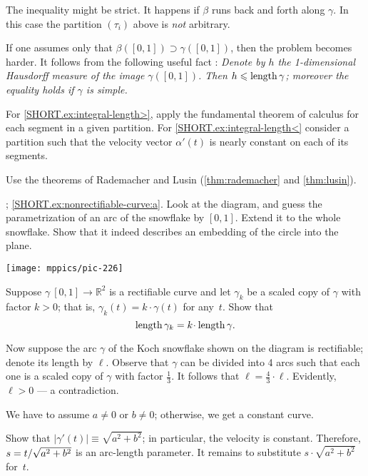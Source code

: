\begin{multicols}{2}
The inequality might be strict.
It happens if $\beta$ runs back and forth along $\gamma$.
In this case the partition $(\tau_i)$ above is \textit{not} arbitrary.

If one assumes only that $\beta([0,1])\supset\gamma([0,1])$, then the problem becomes harder.
It follows from the following useful fact \cite[2.6.1+2.6.2]{burago-burago-ivanov}:
\textit{Denote by $h$ the 1-dimensional Hausdorff measure of the image $\gamma([0,1])$.
Then $h\leqslant \mathop{\rm length}\nolimits\gamma$;
moreover the equality holds if $\gamma$ is simple.}

For \ref{SHORT.ex:integral-length>}, apply the fundamental theorem of calculus for each segment in a given partition.
For \ref{SHORT.ex:integral-length<} consider a partition such that the velocity vector $\alpha'(t)$ is nearly constant on each of its segments.

Use the theorems of Rademacher and Lusin (\ref{thm:rademacher} and \ref{thm:lusin}).

\parbf{\ref{ex:nonrectifiable-curve}}; \ref{SHORT.ex:nonrectifiable-curve:a}.
Look at the diagram, and guess the parametrization of an arc of the snowflake by $[0,1]$.
Extend it to the whole snowflake.
Show that it indeed describes an embedding of the circle into the plane.

\begin{Figure}
\vskip-0mm
\centering
\texttt{[image: mppics/pic-226]}
\vskip0mm
\end{Figure}

Suppose $\gamma\:[0,1]\to\mathbb{R}^2$ is a rectifiable curve and let $\gamma_k$ be a scaled copy of $\gamma$ with factor $k>0$;
that is, $\gamma_k(t)=k\cdot\gamma(t)$ for any~$t$.
Show that 
\[\length\gamma_k=k\cdot\length \gamma.\]

Now suppose the arc $\gamma$ of the Koch snowflake shown on the diagram is rectifiable; denote its length by $\ell$.
Observe that $\gamma$ can be divided into 4 arcs such that each one is a scaled copy of $\gamma$ with factor $\tfrac13$.
It follows that $\ell=\tfrac43\cdot\ell$.
Evidently, $\ell>0$ --- a contradiction.

We have to assume $a\ne 0$ or $b\ne0$;
otherwise, we get a constant curve.

Show that $|\gamma'(t)|\equiv \sqrt{a^2+b^2}$;
in particular, the velocity is constant.
Therefore, $s\z=t/\sqrt{a^2+b^2}$ is an arc-length parameter.
It remains to substitute $s\cdot \sqrt{a^2+b^2}$ for~$t$.





\end{multicols}
